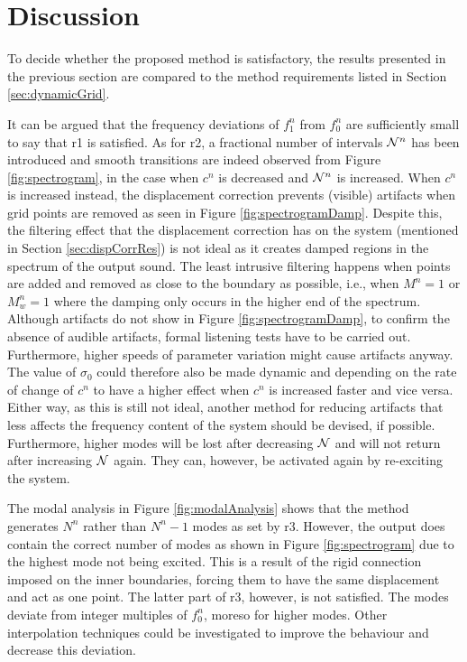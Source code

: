 \section{Discussion}\label{sec:discussion}
To decide whether the proposed method is satisfactory, the results presented in the previous section are compared to the method requirements listed in Section \ref{sec:dynamicGrid}.%

It can be argued that the frequency deviations of $f_1^n$ from $f_0^n$ are sufficiently small to say that r1 is satisfied. As for r2, a fractional number of intervals $\mathcal{N}^n$ has been introduced and smooth transitions are indeed observed from Figure \ref{fig:spectrogram}, in the case when $c^n$ is decreased and $\mathcal{N}^n$ is increased. When $c^n$ is increased instead, the displacement correction prevents (visible) artifacts when grid points are removed as seen in Figure \ref{fig:spectrogramDamp}. Despite this, the filtering effect that the displacement correction has on the system (mentioned in Section \ref{sec:dispCorrRes}) is not ideal as it creates damped regions in the spectrum of the output sound. The least intrusive filtering happens when points are added and removed as close to the boundary as possible, i.e., when $M^n = 1$ or $M_w^n = 1$ where the damping only occurs in the higher end of the spectrum. Although artifacts do not show in Figure \ref{fig:spectrogramDamp}, to confirm the absence of audible artifacts, formal listening tests have to be carried out. Furthermore, higher speeds of parameter variation might cause artifacts anyway. The value of $\sigma_0$ could therefore also be made dynamic and depending on the rate of change of $c^n$ to have a higher effect when $c^n$ is increased faster and vice versa.
Either way, as this is still not ideal, another method for reducing artifacts that less affects the frequency content of the system should be devised, if possible. Furthermore, higher modes will be lost after decreasing $\mathcal{N}$ and will not return after increasing $\mathcal{N}$ again. They can, however, be activated again by re-exciting the system. 

The modal analysis in Figure \ref{fig:modalAnalysis} shows that the method generates $N^n$ rather than $N^n - 1$ modes as set by r3. However, the output does contain the correct number of modes as shown in Figure \ref{fig:spectrogram} due to the highest mode not being excited. This is a result of the rigid connection imposed on the inner boundaries, forcing them to have the same displacement and act as one point. %
%
The latter part of r3, however, is not satisfied. The modes deviate from integer multiples of $f_0^n$, moreso for higher modes. Other interpolation techniques could be investigated to improve the behaviour and decrease this deviation.

